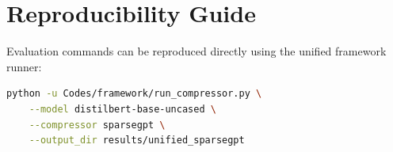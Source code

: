 \section{Reproducibility Guide}
Evaluation commands can be reproduced directly using the unified framework runner:
\begin{lstlisting}[language=bash]
python -u Codes/framework/run_compressor.py \
    --model distilbert-base-uncased \
    --compressor sparsegpt \
    --output_dir results/unified_sparsegpt
\end{lstlisting}
